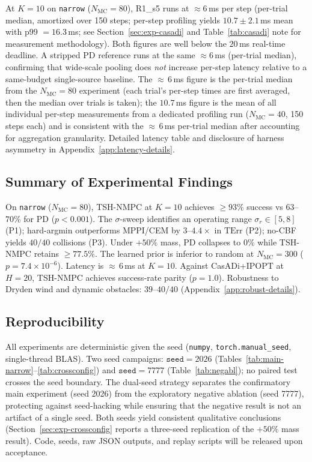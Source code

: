 \documentclass[11pt,onecolumn,a4paper]{article}
\newcommand{\Nm}{N_{\mathrm{MC}}}
\newcommand{\TErr}{\mathrm{TErr}}
\begin{document}
At $K = 10$ on \texttt{narrow} ($\Nm = 80$), R1\_s5 runs at
$\approx 6\,$ms per step (per-trial median, amortized over 150 steps;
per-step profiling yields $10.7 \pm 2.1\,$ms mean with
p99 $= 16.3\,$ms; see Section~\ref{sec:exp-casadi} and
Table~\ref{tab:casadi} note for measurement methodology).
Both figures are well below the $20\,$ms real-time
deadline. A stripped PD reference runs at the same
$\approx 6\,$ms (per-trial median), confirming that wide-scale pooling
does \emph{not} increase per-step latency relative to a same-budget
single-source baseline. The ${\approx}\,6\,$ms figure is the per-trial
median from the $\Nm = 80$ experiment (each trial's per-step times are
first averaged, then the median over trials is taken); the
$10.7\,$ms figure is the mean of all individual per-step measurements
from a dedicated profiling run ($\Nm = 40$, 150 steps each) and is
consistent with the ${\approx}\,6\,$ms per-trial median after
accounting for aggregation granularity. Detailed latency table
and disclosure of harness asymmetry
in Appendix~\ref{app:latency-details}.

\subsection{Summary of Experimental Findings}

On \texttt{narrow} ($\Nm = 80$), TSH-NMPC at $K = 10$ achieves
$\ge 93\%$ success vs $63$--$70\%$ for PD ($p < 0.001$). The
$\sigma$-sweep identifies an operating range $\sigma_r \in [5, 8]$
(P1); hard-argmin outperforms MPPI/CEM by $3$--$4.4\times$ in $\TErr$
(P2); no-CBF yields $40/40$ collisions (P3). Under $+50\%$ mass, PD
collapses to $0\%$ while TSH-NMPC retains $\ge 77.5\%$. The learned
prior is inferior to random at $\Nm = 300$ ($p = 7.4\times 10^{-6}$).
Latency is ${\approx}\,6\,$ms at $K = 10$. Against CasADi+IPOPT at
$H = 20$, TSH-NMPC achieves success-rate parity ($p = 1.0$).
Robustness to Dryden wind and dynamic obstacles:
$39$--$40/40$ (Appendix~\ref{app:robust-details}).

\subsection{Reproducibility}\label{sec:exp-repro}

All experiments are deterministic given the seed (\texttt{numpy},
\texttt{torch.manual\_seed}, single-thread BLAS). Two seed campaigns:
$\texttt{seed} = 2026$ (Tables~\ref{tab:main-narrow}--\ref{tab:crossconfig})
and $\texttt{seed} = 7777$ (Table~\ref{tab:negabl}); no paired test
crosses the seed boundary. The dual-seed strategy separates the
confirmatory main experiment (seed 2026) from the exploratory
negative ablation (seed 7777), protecting against seed-hacking while
ensuring that the negative result is not an artifact of a single seed.
Both seeds yield consistent qualitative conclusions
(Section~\ref{sec:exp-crossconfig} reports a three-seed replication of
the $+50\%$ mass result). Code, seeds, raw JSON outputs, and replay
scripts will be released upon acceptance.
\end{document}
